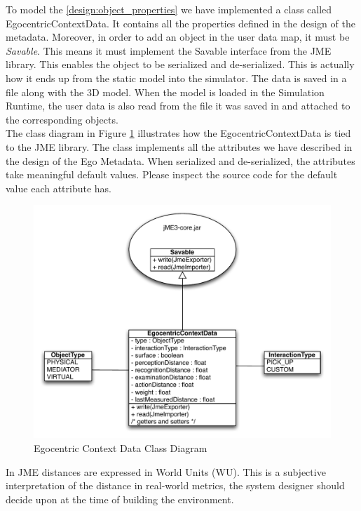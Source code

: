 To model the \ref{design:object_properties} we have implemented a class called EgocentricContextData. It contains all the properties defined in the design of the metadata. Moreover, in order to add an object in the user data map, it must be \emph{Savable}. This means it must implement the Savable interface from the JME library. This enables the object to be serialized and de-serialized. This is actually how it ends up from the static model into the simulator. The data is saved in a file along with the 3D model. When the model is loaded in the Simulation Runtime, the user data is also read from the file it was saved in and attached to the corresponding objects.\\

The class diagram in Figure \ref{fig:impl_egocentric_context_data} illustrates how the EgocentricContextData is tied to the JME library. The class implements all the attributes we have described in the design of the Ego Metadata. When serialized and de-serialized, the attributes take meaningful default values. Please inspect the source code for the default value each attribute has.
\begin{figure}[H]
	\centering
	\includegraphics[width=\linewidth]{gfx/Chapter4/ego_metadata}
	\caption{Egocentric Context Data Class Diagram}
	\label{fig:impl_egocentric_context_data}
\end{figure}

In JME distances are expressed in World Units (WU). This is a subjective interpretation of the distance in real-world metrics, the system designer should decide upon at the time of building the environment.\\

